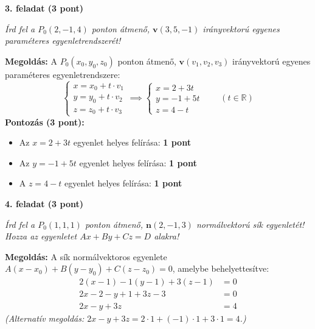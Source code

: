 \documentclass[11pt, a4paper]{article}
\begin{document}
\vspace{6pt}{\color{rulegray}\hrule}\vspace{8pt}

{\color{primary}\bfseries 3. feladat (3 pont)}

\textit{Írd fel a $P_0(2,-1,4)$ ponton átmenő, $\mathbf{v}(3,5,-1)$ irányvektorú egyenes paraméteres egyenletrendszerét!}

\textbf{Megoldás:} A $P_0(x_0, y_0, z_0)$ ponton átmenő, $\mathbf{v}(v_1, v_2, v_3)$ irányvektorú egyenes paraméteres egyenletrendszere:
\[
\begin{cases}
x = x_0 + t \cdot v_1 \\
y = y_0 + t \cdot v_2 \\
z = z_0 + t \cdot v_3
\end{cases}
\implies
\begin{cases}
x = 2 + 3t \\
y = -1 + 5t \\
z = 4 - t
\end{cases}
\qquad (t \in \mathbb{R})
\]
{\color{muted}\small\textbf{Pontozás (3 pont):}}
\begin{itemize}
    \item {\color{muted}\small Az $x = 2 + 3t$ egyenlet helyes felírása: \textbf{1 pont}}
    \item {\color{muted}\small Az $y = -1 + 5t$ egyenlet helyes felírása: \textbf{1 pont}}
    \item {\color{muted}\small A $z = 4 - t$ egyenlet helyes felírása: \textbf{1 pont}}
\end{itemize}

\vspace{6pt}{\color{rulegray}\hrule}\vspace{8pt}

{\color{primary}\bfseries 4. feladat (3 pont)}

\textit{Írd fel a $P_0(1,1,1)$ ponton átmenő, $\mathbf{n}(2,-1,3)$ normálvektorú sík egyenletét! Hozza az egyenletet $Ax+By+Cz=D$ alakra!}

\textbf{Megoldás:} A sík normálvektoros egyenlete $A(x - x_0) + B(y - y_0) + C(z - z_0) = 0$, amelybe behelyettesítve:
\[
\begin{aligned}
2(x - 1) - 1(y - 1) + 3(z - 1) &= 0 \\
2x - 2 - y + 1 + 3z - 3 &= 0 \\
2x - y + 3z &= 4
\end{aligned}
\]
\textit{(Alternatív megoldás: $2x - y + 3z = 2\cdot 1 + (-1)\cdot 1 + 3\cdot 1 = 4$.)}
\end{document}
